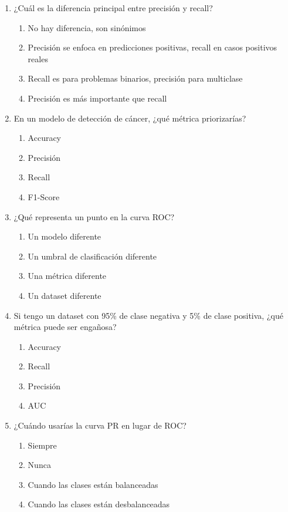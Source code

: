 \documentclass[12pt]{article}
\begin{document}
\begin{enumerate}
    \item ¿Cuál es la diferencia principal entre precisión y recall?
    \begin{enumerate}
        \item No hay diferencia, son sinónimos
        \item Precisión se enfoca en predicciones positivas, recall en casos positivos reales
        \item Recall es para problemas binarios, precisión para multiclase
        \item Precisión es más importante que recall
    \end{enumerate}
    
    \item En un modelo de detección de cáncer, ¿qué métrica priorizarías?
    \begin{enumerate}
        \item Accuracy
        \item Precisión
        \item Recall
        \item F1-Score
    \end{enumerate}
    
    \item ¿Qué representa un punto en la curva ROC?
    \begin{enumerate}
        \item Un modelo diferente
        \item Un umbral de clasificación diferente
        \item Una métrica diferente
        \item Un dataset diferente
    \end{enumerate}
    
    \item Si tengo un dataset con 95\% de clase negativa y 5\% de clase positiva, ¿qué métrica puede ser engañosa?
    \begin{enumerate}
        \item Accuracy
        \item Recall
        \item Precisión
        \item AUC
    \end{enumerate}
    
    \item ¿Cuándo usarías la curva PR en lugar de ROC?
    \begin{enumerate}
        \item Siempre
        \item Nunca
        \item Cuando las clases están balanceadas
        \item Cuando las clases están desbalanceadas
    \end{enumerate}
    

\end{enumerate}
\end{document}
